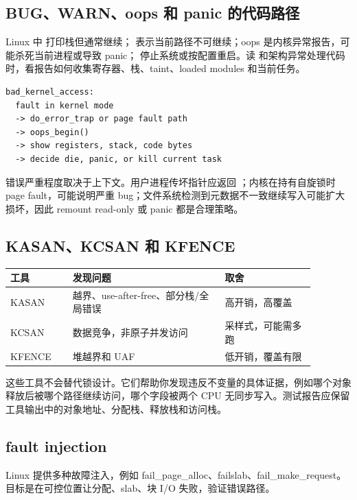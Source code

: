 \subsection{BUG、WARN、oops 和 panic 的代码路径}

Linux 中  打印栈但通常继续； 表示当前路径不可继续；oops 是内核异常报告，可能杀死当前进程或导致 panic； 停止系统或按配置重启。读  和架构异常处理代码时，看报告如何收集寄存器、栈、taint、loaded modules 和当前任务。

\begin{lstlisting}
bad_kernel_access:
  fault in kernel mode
  -> do_error_trap or page fault path
  -> oops_begin()
  -> show registers, stack, code bytes
  -> decide die, panic, or kill current task
\end{lstlisting}

错误严重程度取决于上下文。用户进程传坏指针应返回 ；内核在持有自旋锁时 page fault，可能说明严重 bug；文件系统检测到元数据不一致继续写入可能扩大损坏，因此 remount read-only 或 panic 都是合理策略。

\subsection{KASAN、KCSAN 和 KFENCE}

\begin{longtable}{|p{0.18\linewidth}|p{0.44\linewidth}|p{0.26\linewidth}|}
\toprule
工具 & 发现问题 & 取舍 \\
\midrule
KASAN & 越界、use-after-free、部分栈/全局错误 & 高开销，高覆盖 \\\tablerowrule
KCSAN & 数据竞争，非原子并发访问 & 采样式，可能需多跑 \\\tablerowrule
KFENCE & 堆越界和 UAF & 低开销，覆盖有限 \\
\bottomrule
\end{longtable}

这些工具不会替代锁设计。它们帮助你发现违反不变量的具体证据，例如哪个对象释放后被哪个路径继续访问，哪个字段被两个 CPU 无同步写入。测试报告应保留工具输出中的对象地址、分配栈、释放栈和访问栈。

\subsection{fault injection}

Linux 提供多种故障注入，例如 fail\_page\_alloc、failslab、fail\_make\_request。目标是在可控位置让分配、slab、块 I/O 失败，验证错误路径。


